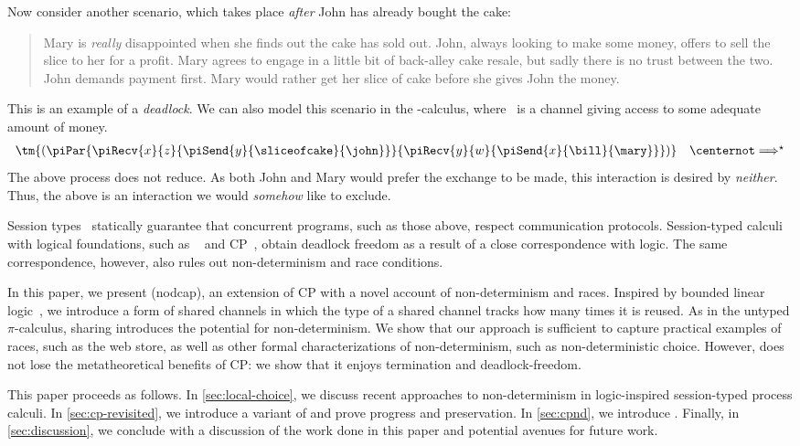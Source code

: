 \documentclass[UKenglish]{llncs}
\begin{document}
Now consider another scenario, which takes place \emph{after} John has already
bought the cake:
\begin{quote}
  Mary is \emph{really} disappointed when she finds out the cake has sold out.
  John, always looking to make some money, offers to sell the slice to her for a
  profit. Mary agrees to engage in a little bit of back-alley cake resale, but
  sadly there is no trust between the two.
  John demands payment first.
  Mary would rather get her slice of cake before she gives John the money.
\end{quote}
This is an example of a \emph{deadlock}. We can also model this scenario in the
\textpi-calculus, where \bill\ is a channel giving access to some adequate
amount of money. 
\[
  \begin{array}{c}
    \tm{(\piPar{%
    \piRecv{x}{z}{\piSend{y}{\sliceofcake}{\john}}
    }{%
    \piRecv{y}{w}{\piSend{x}{\bill}{\mary}}
    })}
    \quad
    \centernot\Longrightarrow^{\star}
  \end{array}  
\]
The above process does not reduce. As both John and Mary would prefer the
exchange to be made, this interaction is desired by \emph{neither}. Thus, the
above is an interaction we would \emph{somehow} like to exclude.

Session types~\cite{honda1993} statically guarantee that concurrent
programs, such as those above, respect communication protocols.
Session-typed calculi with logical foundations, such as
\piDILL~\cite{caires2010} and CP~\cite{wadler2012}, obtain deadlock freedom as a
result of a close correspondence with logic.
The same correspondence, however, also rules out non-determinism and race
conditions.

In this paper, we present \nodcap (nodcap), an extension of
CP with a novel account of non-determinism and races.
Inspired by bounded linear logic~\cite{girard1992}, we introduce a form of
shared channels in which the type of a shared channel tracks how many times it
is reused.
As in the untyped $\pi$-calculus, sharing introduces the potential for
non-determinism.
We show that our approach is sufficient to capture practical examples of races,
such as the web store, as well as other formal characterizations of
non-determinism, such as non-deterministic choice.  However, \nodcap does not
lose the metatheoretical benefits of CP: we show that it enjoys termination and
deadlock-freedom.

This paper proceeds as follows.
In \cref{sec:local-choice}, we discuss recent approaches to non-determinism in
logic-inspired session-typed process calculi.
In \cref{sec:cp-revisited}, we introduce a variant of \cp and prove progress and
preservation.
In \cref{sec:cpnd}, we introduce \nodcap.
Finally, in \cref{sec:discussion}, we conclude with a discussion of the work
done in this paper and potential avenues for future work.
\end{document}
